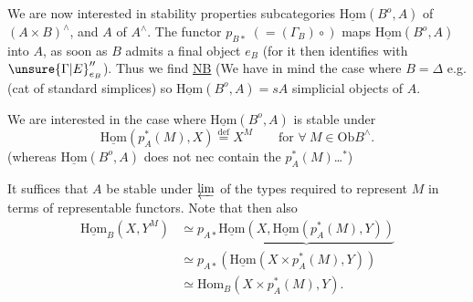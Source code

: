 We are now interested in stability properties  subcategories \(\underline{\mathrm{Hom}}(B^o,A)\) of \((A\times B)^\wedge\), and \(A\) of \(A^\wedge\). The functor \(p_{B*}\;(=(\Gamma_B)\circ)\) maps  \(\underline{\mathrm{Hom}}(B^o,A)\) into \(A\), as soon as \(B\) admits a final object \(e_B\) (for it then identifies with \(\unsure{\Gamma|E}_{e_B}''\)). Thus we find
\uline{NB} (We have in mind the case where \(B=\Delta\) e.g. (cat of standard simplices) so \(\underline{\mathrm{Hom}}(B^o,A)=sA\) simplicial objects of \(A\).

 We are interested  in the case where \(\underline{\mathrm{Hom}}(B^o,A)\) is stable under
\[\underline{\mathrm{Hom}}(p_A^*(M),X)\overset{\mathrm{def}}=X^M\qquad\text{for }\forall\ M\in\mathrm{Ob}B^\wedge.\]
(whereas \(\underline{\mathrm{Hom}}(B^o,A)\) does not nec contain the \(p_A^*(M)\)\ldots\(^{*}\))

It suffices that \(A\) be stable under \(\varprojlim\) of the types required to represent \(M\)  in terms of representable functors.
Note that then also
\[
\begin{aligned}
\underline{\mathrm{Hom}}_B(X,Y^M)&\simeq p_{A*}\underbrace{\underline{\mathrm{Hom}}(X,\underline{\mathrm{Hom}}(p_A^*(M),Y))}\\
&\simeq p_{A*}(\underline{\mathrm{Hom}}(X\times p_A^*(M),Y))\\
&\simeq\mathrm{Hom}_B(X\times p_A^*(M),Y).
\end{aligned}
\]
